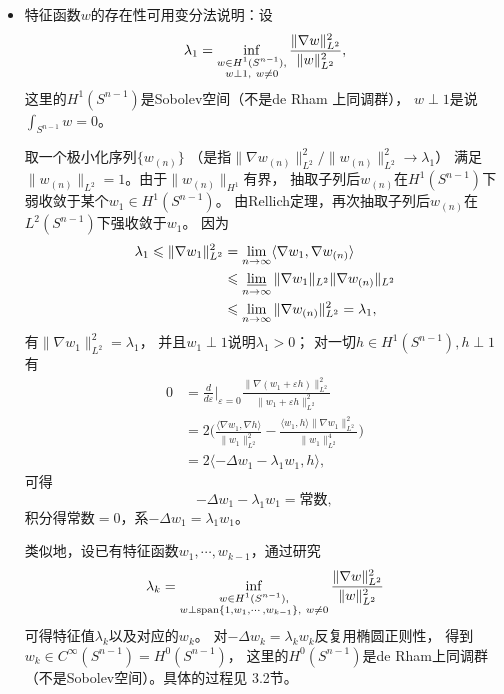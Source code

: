 \begin{itemize}
    \item[注：] 特征函数$w$的存在性可用变分法说明：设
    $$\lambda_1=\inf_{\begin{subarray}{c}w\in H^1(S^{n-1}),\\
        w\perp1,\ w\ne0
    \end{subarray}}\frac{\|\nabla w\|^2_{L^2}}{\|w\|^2_{L^2}},$$
    这里的$H^1(S^{n-1})$是Sobolev空间（不是de Rham 上同调群），
    $w\perp1$是说$\int_{S^{n-1}} w=0$。
    
    取一个极小化序列$\{w_{(n)}\}$
    （是指$\|\nabla w_{(n)}\|_{L^2}^2\big/\|w_{(n)}\|_{L^2}^2\to\lambda_1$）
    满足$\|w_{(n)}\|_{L^2}=1$。由于$\|w_{(n)}\|_{H^1}$有界，
    抽取子列后$w_{(n)}$在$H^1(S^{n-1})$下弱收敛于某个$w_1\in H^1(S^{n-1})$。
    由Rellich定理，再次抽取子列后$w_{(n)}$在$L^2(S^{n-1})$下强收敛于$w_1$。
    因为
    \begin{align*}\lambda_1\leqslant\|\nabla w_1\|_{L^2}^2
    &=\lim_{n\to\infty}\langle\nabla w_1,\nabla w_{(n)}\rangle\\
    &\leqslant\varliminf_{n\to\infty}\|\nabla w_1\|_{L^2}\|\nabla w_{(n)}\|_{L^2}\\
    &\leqslant\lim_{n\to\infty}\|\nabla w_{(n)}\|_{L^2}^2=\lambda_1,\end{align*}
    有$\|\nabla w_1\|_{L^2}^2=\lambda_1$，
    并且$w_1\perp1$说明$\lambda_1>0$；
    对一切$h\in H^1(S^{n-1}),h\perp1$有
    \begin{align*}0&=\frac{d}{d\varepsilon}\bigg|_{\varepsilon=0}
    \frac{\|\nabla(w_1+\varepsilon h)\|^2_{L^2}}{\|w_1+\varepsilon h\|^2_{L^2}}\\
    &=2\bigg(\frac{\langle\nabla w_1,\nabla h\rangle}{\|w_1\|_{L^2}^2}
    -\frac{\langle w_1,h\rangle\|\nabla w_1\|_{L^2}^2}{\|w_1\|_{L^2}^4}\bigg)\\
    &=2\langle-\Delta w_1-\lambda_1w_1,h\rangle,\end{align*}
    可得
    $$-\Delta w_1-\lambda_1 w_1=\text{常数},$$
    积分得常数$=0$，系$-\Delta w_1=\lambda_1w_1$。

    类似地，设已有特征函数$w_1,\cdots,w_{k-1}$，通过研究
    $$\lambda_k=\inf_{\begin{subarray}{c}w\in H^1(S^{n-1}),\\
        w\perp\operatorname{span}\{1,w_1,\cdots,w_{k-1}\},\ w\ne0
    \end{subarray}}\frac{\|\nabla w\|^2_{L^2}}{\|w\|^2_{L^2}}$$
    可得特征值$\lambda_k$以及对应的$w_k$。
    对$-\Delta w_k=\lambda_kw_k$反复用椭圆正则性，
    得到$w_k\in C^\infty(S^{n-1})=H^0(S^{n-1})$，
    这里的$H^0(S^{n-1})$是de Rham上同调群（不是Sobolev空间）。具体的过程见\cite{Jo} 3.2节。


\end{itemize}

